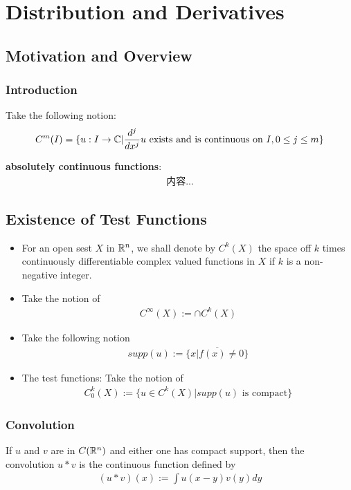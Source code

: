 \documentclass[Total.tex]{subfiles}
\begin{document}
	\chapter{Distribution and Derivatives}
		\section{Motivation and Overview}
			\subsection{Introduction}
				Take the following notion:
				\begin{gather*}
					C^m(I)=\{u:I\rightarrow \mathbb{C}|\frac{d^j}{dx^j}u\mbox{ exists and is continuous on }I,0\leq j\leq m\}
				\end{gather*}
				
				\textbf{absolutely continuous functions}:
				\begin{gather*}
					内容...
				\end{gather*}
		\section{Existence of Test Functions}
			\begin{Def}
				\begin{itemize}
					\item For an open sest $X$ in $\mathbb{R}^n$, we shall denote by $C^k(X)$ the space off $k$ times continuously differentiable complex valued functions in $X$ if $k$ is a non-negative integer.
					\item Take the notion of
					\begin{gather*}
						C^\infty(X):=\cap C^k(X)
					\end{gather*}
					\item Take the following notion\begin{gather*}
						supp(u):=\overline{\{x|f(x)\not=0\}}
					\end{gather*}
					\item The test functions: Take the notion of
					\begin{gather*}
					C_0^k(X):=\{u\in C^k(X)|supp(u)\mbox{ is compact}\}
					\end{gather*}
				\end{itemize}
			\end{Def}
			
			\subsection{Convolution}
				\begin{Def}
					If $u$ and $v$ are in $C(\mathbb{R}^n)$ and either one has compact support, then the convolution $u*v$ is the continuous function defined by
					\begin{gather*}
						(u*v)(x):=\int u(x-y)v(y)dy
					\end{gather*}
				\end{Def}
\end{document}
